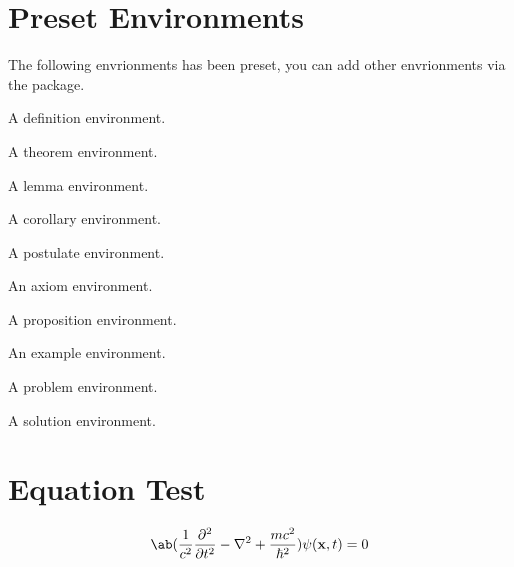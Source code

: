 \section{Preset Environments}
The following envrionments has been preset, you can add other envrionments via the  package.

\begin{multicols}{2}

\begin{definition}
    A definition environment.
\end{definition}

\begin{theorem}
    A theorem environment.
\end{theorem}

\begin{lemma}
    A lemma environment.
\end{lemma}

\begin{corollary}
    A corollary environment.
\end{corollary}

\begin{postulate}
    A postulate environment.
\end{postulate}

\begin{axiom}
    An axiom environment.
\end{axiom}

\begin{proposition}
    A proposition environment.
\end{proposition}

\begin{example}
    An example environment.
\end{example}

\begin{problem}
    A problem environment.
\end{problem}

\begin{solution}
    A solution environment.
\end{solution}

\end{multicols}

\section{Equation Test}
\begin{equation}
    \ab(\frac1{c^2}\frac{\partial^2}{\partial t^2}-\nabla^2+\frac{mc^2}{\hbar^2})\psi(\mathbf x,t)=0
    \label{1.6.1}
\end{equation}

